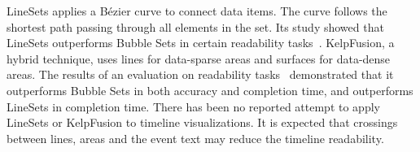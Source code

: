 LineSets applies a B\'{e}zier curve to connect data items. The curve follows the shortest path passing through all elements in the set. Its study showed that LineSets outperforms Bubble Sets in certain readability tasks~\cite{Alper2011}. KelpFusion, a hybrid technique, uses lines for data-sparse areas and surfaces for data-dense areas. The results of an evaluation on readability tasks~\cite{Meulemans2013} demonstrated that it outperforms Bubble Sets in both accuracy and completion time, and outperforms LineSets in completion time. There has been no reported attempt to apply LineSets or KelpFusion to timeline visualizations. It is expected that crossings between lines, areas and the event text may reduce the timeline readability.